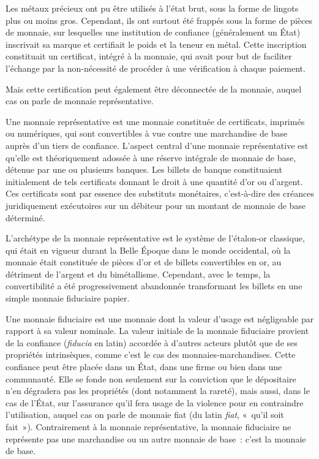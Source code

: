 Les métaux précieux ont pu être utilisés à l'état brut, sous la forme de lingots plus ou moins gros. Cependant, ils ont surtout été frappés sous la forme de pièces de monnaie, sur lesquelles une institution de confiance (généralement un État) inscrivait sa marque et certifiait le poids et la teneur en métal. Cette inscription constituait un certificat, intégré à la monnaie, qui avait pour but de faciliter l'échange par la non-nécessité de procéder à une vérification à chaque paiement.


Mais cette certification peut également être déconnectée de la monnaie, auquel cas on parle de monnaie représentative.

Une monnaie représentative est une monnaie constituée de certificats, imprimés ou numériques, qui sont convertibles à vue contre une marchandise de base auprès d'un tiers de confiance. L'aspect central d'une monnaie représentative est qu'elle est théoriquement adossée à une réserve intégrale de monnaie de base, détenue par une ou plusieurs banques. Les billets de banque constituaient initialement de tels certificats donnant le droit à une quantité d'or ou d'argent. Ces certificats sont par essence des substituts monétaires, c'est-à-dire des créances juridiquement exécutoires sur un débiteur pour un montant de monnaie de base déterminé.

L'archétype de la monnaie représentative est le système de l'étalon-or classique, qui était en vigueur durant la Belle Époque dans le monde occidental, où la monnaie était constituée de pièces d'or et de billets convertibles en or, au détriment de l'argent et du bimétallisme. Cependant, avec le temps, la convertibilité a été progressivement abandonnée transformant les billets en une simple monnaie fiduciaire papier.


Une monnaie fiduciaire est une monnaie dont la valeur d'usage est négligeable par rapport à sa valeur nominale. La valeur initiale de la monnaie fiduciaire provient de la confiance (\emph{fiducia} en latin) accordée à d'autres acteurs plutôt que de ses propriétés intrinsèques, comme c'est le cas des monnaies-marchandises. Cette confiance peut être placée dans un État, dans une firme ou bien dans une communauté. Elle se fonde non seulement sur la conviction que le dépositaire n'en dégradera pas les propriétés (dont notamment la rareté), mais aussi, dans le cas de l'État, sur l'assurance qu'il fera usage de la violence pour en contraindre l'utilisation, auquel cas on parle de monnaie fiat (du latin \emph{fiat}, «~qu'il soit fait~»). Contrairement à la monnaie représentative, la monnaie fiduciaire ne représente pas une marchandise ou un autre monnaie de base~: c'est la monnaie de base.

